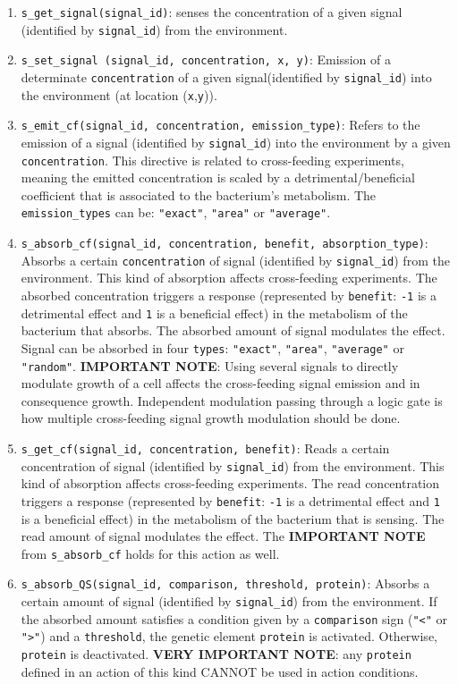 \documentclass[10pt,a4paper]{article}
\begin{document}
\begin{enumerate}
	\item \texttt{s\_get\_signal(signal\_id)}: senses the concentration of a given signal (identified by \texttt{signal\_id}) from the environment.
	\item \texttt{s\_set\_signal (signal\_id, concentration, x, y)}: Emission of a determinate \texttt{concentration} of a given signal(identified by \texttt{signal\_id}) into the environment (at location (\texttt{x},\texttt{y})).
	\item \texttt{s\_emit\_cf(signal\_id, concentration, emission\_type)}: Refers to the emission of a signal (identified by \texttt{signal\_id}) into the environment by a given \texttt{concentration}. This directive is related to cross-feeding experiments, meaning the emitted concentration is scaled by a detrimental/beneficial coefficient that is associated to the bacterium’s metabolism. The \texttt{emission\_types} can be: \texttt{"{}exact"{}}, \texttt{"{}area"{}} or \texttt{"{}average"{}}.
	\item \texttt{s\_absorb\_cf(signal\_id, concentration, benefit, absorption\_type)}: Absorbs a certain \texttt{concentration} of signal (identified by \texttt{signal\_id}) from the environment. This kind of absorption affects cross-feeding experiments. The absorbed concentration triggers a response (represented by \texttt{benefit}: \texttt{-1} is a detrimental effect and \texttt{1} is a beneficial effect) in the metabolism of the bacterium that absorbs. The
absorbed amount of signal modulates the effect. Signal can be absorbed in four \texttt{types}:
\texttt{"{}exact"{}}, \texttt{"{}area"{}}, \texttt{"{}average"{}} or \texttt{"{}random"{}}.
	\textbf{IMPORTANT NOTE}: Using several signals to directly modulate growth of a cell affects the cross-feeding signal emission and in consequence growth. Independent modulation passing through a logic gate is how multiple cross-feeding signal growth modulation should be done. 
	\item \texttt{s\_get\_cf(signal\_id, concentration, benefit)}: Reads a certain concentration of signal (identified by \texttt{signal\_id}) from the environment. This kind of absorption affects cross-feeding experiments. The read concentration triggers a response (represented by  \texttt{benefit}: \texttt{-1} is a detrimental effect and \texttt{1} is a beneficial effect) in the metabolism of the bacterium that is sensing. The read amount of signal modulates the effect. The \textbf{IMPORTANT NOTE} from \texttt{s\_absorb\_cf} holds for this action as well.
	\item \texttt{s\_absorb\_QS(signal\_id, comparison, threshold, protein)}: Absorbs a certain amount of signal (identified by \texttt{signal\_id}) from the environment. If the absorbed amount satisfies a condition given by a \texttt{comparison} sign (\texttt{"{}<"{}} or \texttt{"{}>"{}}) and a \texttt{threshold}, the genetic element \texttt{protein} is activated. Otherwise, \texttt{protein} is deactivated. \textbf{VERY IMPORTANT NOTE}: any \texttt{protein} defined in an action of this kind CANNOT be used in action conditions.

\end{enumerate}
\end{document}
